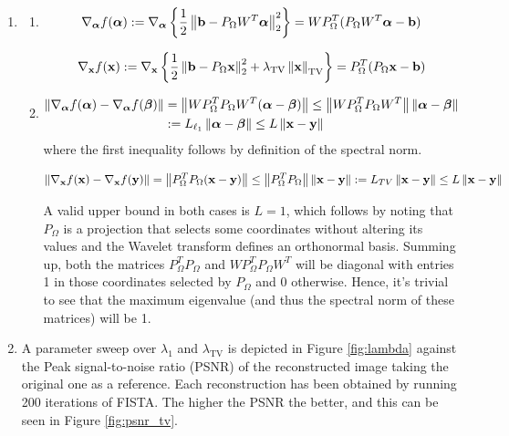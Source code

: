 \documentclass{article}
\begin{document}
\begin{enumerate}[label=2.\arabic*]
    \item 
    \begin{enumerate}[label=\alph*)]
        \item 
        \begin{align}
            \nabla_{\boldsymbol{\alpha}}f(\boldsymbol{\alpha}) :=\nabla_{\boldsymbol{\alpha}} \left\lbrace \frac{1}{2}\left\lVert\mathbf{b} - P_{\Omega} W^T \boldsymbol{\alpha}\right\rVert_2^2 \right\rbrace = W P_{\Omega}^T (P_{\Omega} W^T \boldsymbol{\alpha} - \mathbf{b})
        \end{align}
        
        \begin{align}
            \nabla_{\mathbf{x}}f(\mathbf{x}) := \nabla_{\mathbf{x}} \left\lbrace \frac{1}{2}\left\lVert\mathbf{b} - P_{\Omega} \mathbf{x}\right\rVert_2^2 + \lambda_{\text{TV}}\left\lVert\mathbf{x}\right\rVert_{\text{TV}} \right\rbrace = P_{\Omega}^T (P_{\Omega} \mathbf{x} - \mathbf{b}) 
        \end{align}
        \item 
        \begin{align}
            \left\lVert\nabla_{\boldsymbol{\alpha}}f(\boldsymbol{\alpha}) - \nabla_{\boldsymbol{\alpha}}f(\boldsymbol{\beta})\right\rVert &= \left\lVert W P_{\Omega}^T P_{\Omega} W^T(\boldsymbol{\alpha} - \boldsymbol{\beta})\right\rVert \leq \left\lVert W P_{\Omega}^T P_{\Omega} W^T\right\rVert \left\lVert\boldsymbol{\alpha} - \boldsymbol{\beta}\right\rVert \\
            &:= L_{\ell_1} \left\lVert\boldsymbol{\alpha} - \boldsymbol{\beta}\right\rVert \leq L \left\lVert\mathbf{x} - \mathbf{y}\right\rVert
        \end{align}
        where the first inequality follows by definition of the spectral norm. 
        
        \begin{align}
            \left\lVert\nabla_{\mathbf{x}} f(\mathbf{x}) - \nabla_{\mathbf{x}} f(\mathbf{y})\right\rVert = \left\lVert P_{\Omega} ^TP_{\Omega} (\mathbf{x} - \mathbf{y})\right\rVert \leq \left\lVert P_{\Omega} ^TP_{\Omega}\right\rVert\left\lVert\mathbf{x} - \mathbf{y}\right\rVert := L_{TV}\left\lVert\mathbf{x} - \mathbf{y}\right\rVert \leq L \left\lVert\mathbf{x} - \mathbf{y}\right\rVert
        \end{align}
    
    A valid upper bound in both cases is $L=1$, which follows by noting that $P_{\Omega}$ is a projection that selects some coordinates without altering its values and the Wavelet transform defines an orthonormal basis. Summing up, both the matrices $P_{\Omega}^T P_{\Omega}$ and $W P_{\Omega}^T P_{\Omega} W^T$ will be diagonal with entries 1 in those coordinates selected by $P_{\Omega}$ and 0 otherwise. Hence, it's trivial to see that the maximum eigenvalue (and thus the spectral norm of these matrices) will be 1.
    \end{enumerate}
    \item 
    A parameter sweep over $\lambda_1$ and $\lambda_{\text{TV}}$ is depicted in Figure \ref{fig:lambda} against the Peak signal-to-noise ratio (PSNR) of the reconstructed image taking the original one as a reference. Each reconstruction has been obtained by running 200 iterations of FISTA. The higher the PSNR the better, and this can be seen in Figure \ref{fig:psnr_tv}.
    

\end{enumerate}
\end{document}
